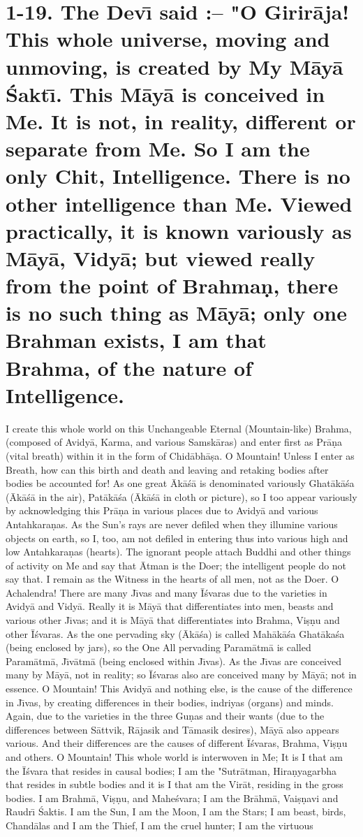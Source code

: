 \chapter{1-19. The Dev\={\i} said :-- "O Girir\=aja! This whole universe, moving and unmoving, is created by My M\=ay\=a \'Sakt\={\i}. This M\=ay\=a is conceived in Me. It is not, in reality, different or separate from Me. So I am the only Chit, Intelligence. There is no other intelligence than Me. Viewed practically, it is known variously as M\=ay\=a, Vidy\=a; but viewed really from the point of Brahma\d{n}, there is no such thing as M\=ay\=a; only one Brahman exists, I am that Brahma, of the nature of Intelligence.}

I create this whole world on this Unchangeable Eternal (Mountain-like) Brahma, (composed of Avidy\=a, Karma, and various Samsk\=aras) and enter first as Pr\=a\d{n}a (vital breath) within it in the form of Chid\=abh\=a\d{s}a. O Mountain! Unless I enter as Breath, how can this birth and death and leaving and retaking bodies after bodies be accounted for! As one great \=Ak\=a\'s\=a is denominated variously Ghat\=ak\=a\'sa (\=Ak\=a\'s\=a in the air), Pat\=ak\=a\'sa (\=Ak\=a\'s\=a in cloth or picture), so I too appear variously by acknowledging this Pr\=a\d{n}a in various places due to Avidy\=a and various Antahkara\d{n}as. As the Sun's rays are never defiled when they illumine various objects on earth, so I, too, am not defiled in entering thus into various high and low Antahkara\d{n}as (hearts). The ignorant people attach Buddhi and other things of activity on Me and say that \=Atman is the Doer; the intelligent people do not say that. I remain as the Witness in the hearts of all men, not as the Doer. O Achalendra! There are many J\={\i}vas and many \=I\'svaras due to the varieties in Avidy\=a and Vidy\=a. Really it is M\=ay\=a that differentiates into men, beasts and various other J\={\i}vas; and it is M\=ay\=a that differentiates into Brahma, Vi\d{s}\d{n}u and other \=I\'svaras. As the one pervading sky (\=Ak\=a\'sa) is called Mah\=ak\=a\'sa Ghat\=aka\'sa (being enclosed by jars), so the One All pervading Param\=atm\=a is called Param\=atm\=a, J\={\i}v\=atm\=a (being enclosed within J\={\i}vas). As the J\={\i}vas are conceived many by M\=ay\=a, not in reality; so \=I\'svaras also are conceived many by M\=ay\=a; not in essence. O Mountain! This Avidy\=a and nothing else, is the cause of the difference in J\={\i}vas, by creating differences in their bodies, indriyas (organs) and minds. Again, due to the varieties in the three Gu\d{n}as and their wants (due to the differences between S\=attvik, R\=ajasik and T\=amasik desires), M\=ay\=a also appears various. And their differences are the causes of different \=I\'svaras, Brahma, Vi\d{s}\d{n}u and others. O Mountain! This whole world is interwoven in Me; It is I that am the \=I\'svara that resides in causal bodies; I am the "Sutr\=atman, Hira\d{n}yagarbha that resides in subtle bodies and it is I that am the Vir\=at, residing in the gross bodies. I am Brahm\=a, Vi\d{s}\d{n}u, and Mahe\'svara; I am the Br\=ahm\=a, Vai\d{s}\d{n}avi and Raudr\={\i} \'Saktis. I am the Sun, I am the Moon, I am the Stars; I am beast, birds, Chand\=alas and I am the Thief, I am the cruel hunter; I am the virtuous 